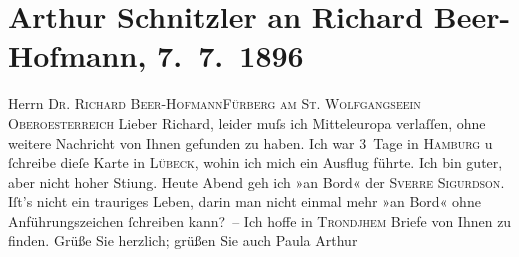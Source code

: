 

         
         \renewcommand{\erwaehntePersonen}{Personen: Richard Beer-Hofmann, Paula Beer-Hofmann}
         \renewcommand{\erwaehnteOrte}{Orte: Europa, Fürberg, Hamburg, Hotel zum Kronprinzen, Lübeck, Oberösterreich, St. Gilgen, Trondheim}
         \renewcommand{\erwaehnteWerke}{}
               \section[Arthur Schnitzler an Richard Beer-Hofmann, 7. 7. 1896]{ Arthur Schnitzler an Richard Beer-Hofmann, 7. 7. 1896}\nopagebreak{}\rehead{ }\begin{ledgroupsized}[t]{13cm}\normalsize\beginnumbering \toendnotes[C]{\smallbreak\pagebreak[2]} 
\toendnotes[C]{\smallbreak}\pstart{}{\pb}Herrn \textsc{Dr. Richard
                     Beer-Hofmann}\pend{}\pstart{}\textsc{Fürberg am St. Wolfgangsee}\pend{}\pstart{}\textsc{in Oberoesterreich}\pend{}{\bigskip}\pstart
           \noindent{}{\pb}Lieber Richard, leider muſs ich Mitteleuropa verlaſſen, ohne weitere Nachricht von Ihnen gefunden zu haben.
               Ich war 3 Tage in \textsc{Hamburg} u ſchreibe dieſe Karte in \textsc{Lübeck}, wohin ich mich ein Ausflug führte. Ich bin guter, aber nicht hoher Sti{\geminationm}ung. Heute Abend geh ich »an Bord« der \textsc{Sverre Sigurdson}. Iſt’s nicht ein trauriges Leben, darin man
               nicht einmal mehr »an Bord« ohne Anführungszeichen ſchreiben kann? – Ich hoffe
               in \textsc{Trondjhem} Briefe von Ihnen zu finden. Grüße Sie herzlich; grüßen Sie auch Paula\pend
           \pstart \label{T_L00560_1v}\label{T_L00560_1h}\spacefill\mbox{Arthur}\pend{}
         
         \endnumbering{}\end{ledgroupsized}  \newcommand{\dateiname}{L00560}\newcommand{\titel}{Arthur Schnitzler an Richard Beer-Hofmann, 7. 7. 1896}\newcommand{\editorInnen}{Martin Anton Müller und Gerd-Hermann Susen}
      